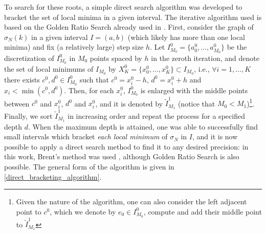To search for these roots, a simple direct search algorithm was developed to bracket the set of local minima in a given interval. The iterative algorithm used is based on the Golden Ratio Search already used in \cite{alves2005method}. First, consider the graph of \(\sigma_N(k)\) in a given interval \(I=(a, b)\) (which likely has more than one local minima) and fix (a relatively large) step size \(h\). Let \(I_{M_0}^0 = \{a_0^0, \dots, a_{M_0}^0\}\) be the discretization of \(I_{M_0}^0\) in \({M_0}\) points spaced by \(h\) in the zeroth iteration, and denote the set of local minimums of \(I_{M_0}\) by \(X^0_K = \{x_0^0, \dots, x_K^0\} \subset I_{M_0}\), i.e., \(\forall i = 1,\dots, K\) there exists \(c^0, d^0 \in I_{M_0}^0\) such that \(c^0 = x_i^0 - h\), \(d^0 = x_i^0 + h\) and \(x_i < \min(c^0, d^0) \). Then, for each \(x_i^0\), \(I_{M_0}^0\) is enlarged with the middle points between \(c^0\) and \(x_i^0\), \(d^0\) and \(x_i^0\), and it is denoted by \(\tilde{I}_{M_1}^1\) (notice that \(M_0 < M_1\))\footnote{Given the nature of the algorithm, one can also consider the left adjacent point to \(c^0\), which we denote by \(e_0 \in I^0_{M_0}\), compute and add their middle point to \(\tilde{I}_{M_1}^1\)}. Finally, we sort \(\tilde{I}_{M_1}^1\) in increasing order and repeat the process for a specified depth \(d\). When the maximum depth is attained, one was able to successfully find small intervals which bracket \textit{each local minimum} of \(\sigma_N\) in \(I\), and it is now possible to apply a direct search method to find it to any desired precision: in this work, Brent's method was used \cite{brent1971algorithm}, although Golden Ratio Search is also possible. The general form of the algorithm is given in \ref{direct_bracketing_algorithm}.


